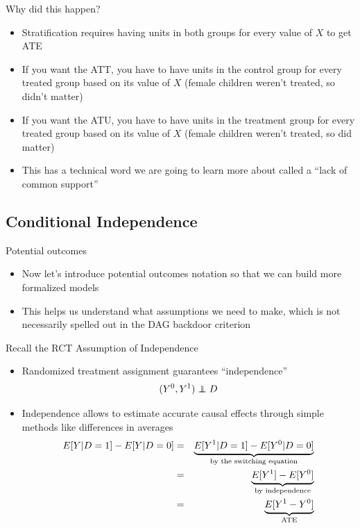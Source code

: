 \documentclass{beamer}
\newcommand\independent{\protect\mathpalette{\protect\independenT}{\perp}}
\def\independenT#1#2{\mathrel{\rlap{$#1#2$}\mkern2mu{#1#2}}}
\begin{document}
\begin{frame}{Why did this happen?}

\begin{itemize}

\item Stratification requires having units in both groups for every value of $X$ to get ATE
\item If you want the ATT, you have to have units in the control group for every treated group based on its value of $X$ (female children weren't treated, so didn't matter)
\item If you want the ATU, you have to have units in the treatment group for every treated group based on its value of $X$ (female children weren't treated, so did matter)
\item This has a technical word we are going to learn more about called a ``lack of common support''
\end{itemize}

\end{frame}

\subsection{Conditional Independence}

\begin{frame}{Potential outcomes}

\begin{itemize}
\item Now let's introduce potential outcomes notation so that we can build more formalized models
\item This helps us understand what assumptions we need to make, which is not necessarily spelled out in the DAG backdoor criterion
\end{itemize}

\end{frame}

\begin{frame}{Recall the RCT Assumption of Independence}
	
	\begin{itemize}
	\item Randomized treatment assignment guarantees ``independence'' $$(Y^0,Y^1)\independent{D}$$
	\item Independence allows to estimate accurate causal effects through simple methods like differences in averages
		\begin{eqnarray*}
		E[Y|D=1] - E[Y|D=0] &=& \underbrace{E[Y^1|D=1] - E[Y^0|D=0]}_{\mathclap{\text{by the switching equation}}} \\
		&=& \underbrace{E[Y^1] - E[Y^0]}_{\mathclap{\text{by independence}}} \\
		&=& \underbrace{E[Y^1-Y^0]}_{\mathclap{\text{ATE}}}
		\end{eqnarray*}
	\end{itemize}
\end{frame}
\end{document}
